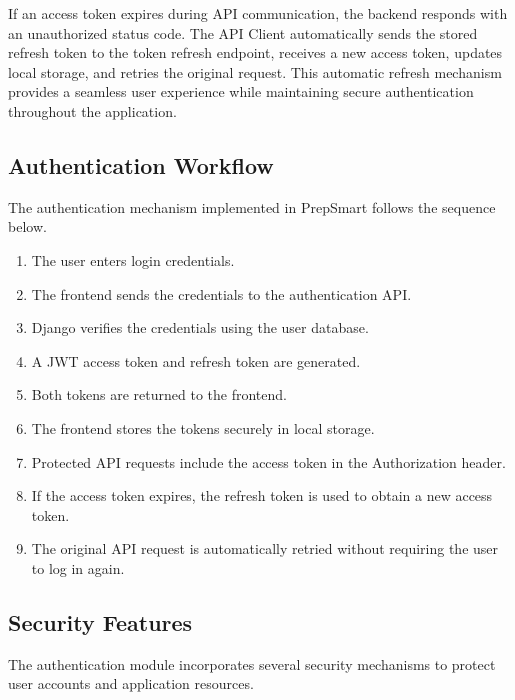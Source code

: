 If an access token expires during API communication, the backend responds with an unauthorized status code. The API Client automatically sends the stored refresh token to the token refresh endpoint, receives a new access token, updates local storage, and retries the original request. This automatic refresh mechanism provides a seamless user experience while maintaining secure authentication throughout the application.

\subsection{Authentication Workflow}

The authentication mechanism implemented in PrepSmart follows the sequence below.

\begin{enumerate}

\item The user enters login credentials.

\item The frontend sends the credentials to the authentication API.

\item Django verifies the credentials using the user database.

\item A JWT access token and refresh token are generated.

\item Both tokens are returned to the frontend.

\item The frontend stores the tokens securely in local storage.

\item Protected API requests include the access token in the Authorization header.

\item If the access token expires, the refresh token is used to obtain a new access token.

\item The original API request is automatically retried without requiring the user to log in again.

\end{enumerate}

\subsection{Security Features}

The authentication module incorporates several security mechanisms to protect user accounts and application resources.

